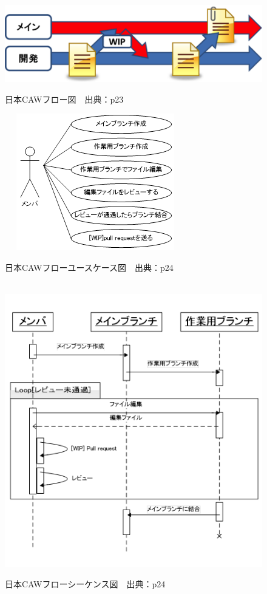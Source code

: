 \begin{figure}[H]
\centering　
\includegraphics[width=13cm]{nihonCAW.png}
\caption{日本CAWフロー図　出典：\cite{onodera2015}p23}\label{tab:日本CAW}
\end{figure}
\begin{figure}[H]
\centering　
\includegraphics{cawyou.png}
\caption{日本CAWフローユースケース図　出典：\cite{onodera2015}p24}\label{tab:cawyou}
\end{figure}
\begin{figure}[H]
\centering　
\includegraphics{cawsi.png}
\caption{日本CAWフローシーケンス図　出典：\cite{onodera2015}p24}\label{tab:cawsi}
\end{figure}


